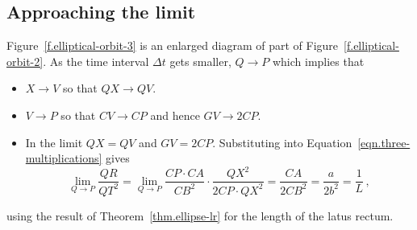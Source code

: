 
\subsection{Approaching the limit}

Figure~\ref{f.elliptical-orbit-3} is an enlarged diagram of part of Figure~\ref{f.elliptical-orbit-2}. As the time interval $\Delta t$ gets smaller, $Q\rightarrow P$ which implies that
\begin{itemize}
\item $X\rightarrow V$ so that $QX\rightarrow QV$.
\item $V\rightarrow P$ so that $CV\rightarrow CP$ and hence $GV\rightarrow 2CP$.
\item In the limit $QX=QV$ and $GV= 2CP$. Substituting into Equation~\ref{eqn.three-multiplications} gives
\[
\lim_{Q\rightarrow P}\frac{QR}{QT^2}=
\lim_{Q\rightarrow P}\frac{CP\cdot CA}{CB^2}\cdot \frac{QX^2}{2CP\cdot QX^2}=
\frac{CA}{2CB^2}=
\frac{a}{2b^2}=\frac{1}{L}\,,
\]
\end{itemize}
using the result of Theorem~\ref{thm.ellipse-lr} for the length of the latus rectum.

